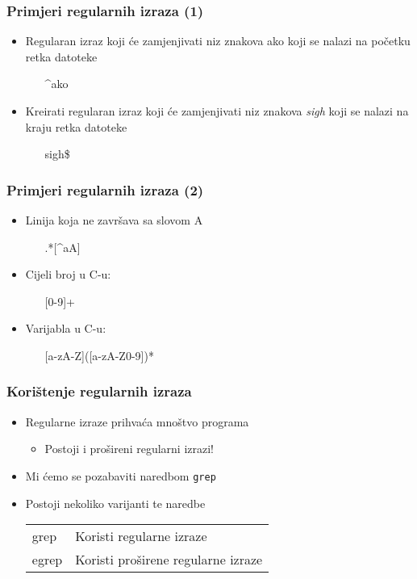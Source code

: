 \documentclass[table,usenames,dvipsnames]{beamer}
\newcommand{\shell}[1]{\texttt{#1}}
\begin{document}
\begin{frame}[t]
\frametitle{Primjeri regularnih izraza (1)}
\begin{itemize}
  \item Regularan izraz koji će zamjenjivati niz znakova ako koji se nalazi na
        početku retka datoteke
  \begin{itemize}
    \item[] \textasciicircum{}ako
  \end{itemize}
  \item Kreirati regularan izraz koji će zamjenjivati niz znakova \emph{sigh}
        koji se nalazi na kraju retka datoteke
  \begin{itemize}
    \item[] sigh\$
  \end{itemize}
\end{itemize}
\end{frame}

\begin{frame}[t]
\frametitle{Primjeri regularnih izraza (2)}
\begin{itemize}
  \item Linija koja ne završava sa slovom A 
  \begin{itemize}
    \item[] .*[\textasciicircum{}aA]
  \end{itemize}
  \item Cijeli broj u C-u:
  \begin{itemize}
    \item[] [0-9]+
  \end{itemize}
  \item Varijabla u C-u:
  \begin{itemize}
    \item[] [a-zA-Z]([a-zA-Z0-9])*
  \end{itemize}
\end{itemize}
\end{frame}

\begin{frame}[t]
\frametitle{Korištenje regularnih izraza}
\begin{itemize}
  \item Regularne izraze prihvaća mnoštvo programa
  \begin{itemize}
    \item Postoji i prošireni regularni izrazi!
  \end{itemize}
  \item Mi ćemo se pozabaviti naredbom \shell{grep}
  \item Postoji nekoliko varijanti te naredbe
  \begin{tabular}{l l}
    grep  &  Koristi regularne izraze \\
    egrep &  Koristi proširene regularne izraze
  \end{tabular}
\end{itemize}
\end{frame}
  
\end{document}
